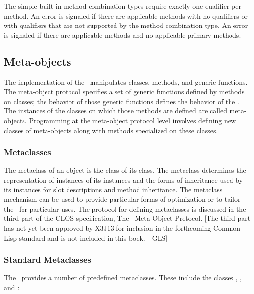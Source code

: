 The simple built-in method combination types require exactly one qualifier per
method.  An error is signaled if there are applicable methods with no
qualifiers or with qualifiers that are not supported by the method
combination type. An error is signaled if there are applicable 
methods and no applicable primary methods.


\subsection{Meta-objects}

The implementation of the \OS\ manipulates classes, methods, and generic
functions.  The meta-object protocol specifies a set of generic
functions defined by methods on classes; the behavior of those generic
functions defines the behavior of the \OS.  The instances of the classes
on which those methods are defined are called {\bit meta-objects}.  Programming
at the meta-object protocol level involves defining new classes of
meta-objects along with methods specialized on these classes.


\subsubsection{Metaclasses}

The {\bit metaclass\/} of an object is the class of its class.  The
metaclass determines the representation of instances of its instances and
the forms of inheritance used by its instances for slot descriptions and
method inheritance.  The metaclass mechanism can be used to provide
particular forms of optimization or to tailor the \CLOS\ for particular
uses.  The protocol for defining metaclasses is discussed in the third part
of the CLOS specification, The \CLOS\ Meta-Object Protocol.
[The third part
has not yet been approved by X3J13 for inclusion in the forthcoming
Common Lisp standard and is not included in this book.---GLS]


\subsubsection{Standard Metaclasses}

The \CLOS\ provides a number of predefined metaclasses.  These include the
classes , , and 
:

